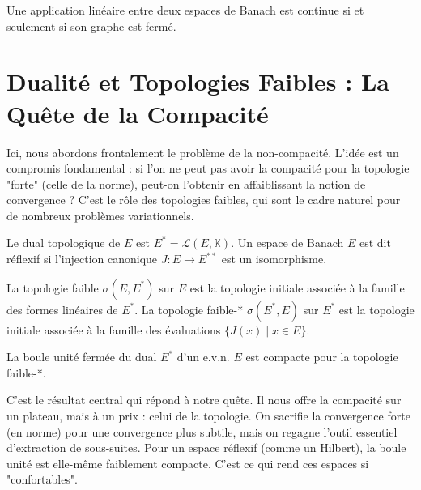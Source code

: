 \begin{theorem}
    Une application linéaire entre deux espaces de Banach est continue si et seulement si son graphe est fermé.
\end{theorem}



\section{Dualité et Topologies Faibles : La Quête de la Compacité}

\begin{objectif}
    Ici, nous abordons frontalement le problème de la non-compacité. L'idée est un compromis fondamental : si l'on ne peut pas avoir la compacité pour la topologie "forte" (celle de la norme), peut-on l'obtenir en affaiblissant la notion de convergence ? C'est le rôle des topologies faibles, qui sont le cadre naturel pour de nombreux problèmes variationnels.
\end{objectif}

\begin{definition}
    Le dual topologique de $E$ est $E^* = \mathcal{L}(E, \mathbb{K})$. Un espace de Banach $E$ est dit réflexif si l'injection canonique $J: E \to E^{**}$ est un isomorphisme.
\end{definition}

\begin{definition}
    La topologie faible $\sigma(E, E^*)$ sur $E$ est la topologie initiale associée à la famille des formes linéaires de $E^*$.
    La topologie faible-* $\sigma(E^*, E)$ sur $E^*$ est la topologie initiale associée à la famille des évaluations $\{J(x) \mid x \in E\}$.
\end{definition}

\begin{theorem}
    La boule unité fermée du dual $E^*$ d'un e.v.n. $E$ est compacte pour la topologie faible-*.
\end{theorem}

\begin{remark}
    C'est le résultat central qui répond à notre quête. Il nous offre la compacité sur un plateau, mais à un prix : celui de la topologie. On sacrifie la convergence forte (en norme) pour une convergence plus subtile, mais on regagne l'outil essentiel d'extraction de sous-suites. Pour un espace réflexif (comme un Hilbert), la boule unité est elle-même faiblement compacte. C'est ce qui rend ces espaces si "confortables".
\end{remark}



